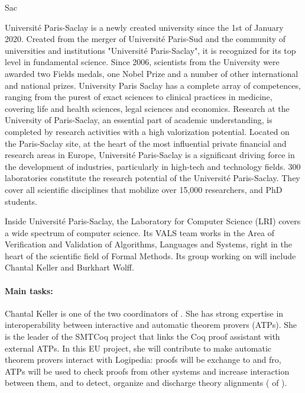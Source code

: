 \begin{sitedescription}{Sac}


Université Paris-Saclay is a newly created university since the 1st of
January 2020. Created from the merger of Université Paris-Sud and the
community of universities and institutions "Université Paris-Saclay", it
is recognized for its top level in fundamental science.  Since 2006,
scientists from the University were awarded two Fields medals, one Nobel
Prize and a number of other international and national prizes.
University Paris Saclay has a complete array of competences, ranging
from the purest of exact sciences to clinical practices in medicine,
covering life and health sciences, legal sciences and economics.
Research at the University of Paris-Saclay, an essential part of
academic understanding, is completed by research activities with a high
valorization potential. Located on the Paris-Saclay site, at the heart
of the most influential private financial and research areas in Europe,
Université Paris-Saclay is a significant driving force in the
development of industries, particularly in high-tech and technology
fields. 300 laboratories constitute the research potential of the
Université Paris-Saclay. They cover all scientific disciplines that
mobilize over 15,000 researchers, and PhD students.

Inside Université Paris-Saclay, the Laboratory for Computer Science
(LRI) covers a wide spectrum of computer science. Its VALS team works in
the Area of Verification and Validation of Algorithms, Languages and
Systems, right in the heart of the scientific field of Formal Methods.
Its group working on \pn will include Chantal Keller and Burkhart Wolff.

\paragraph*{Main tasks:}

\begin{compactitem}
\item Chantal Keller is one of the two coordinators of . She has
strong expertise in interoperability between interactive and automatic
theorem provers (ATPs). She is the leader of the SMTCoq project that
links the Coq proof assistant with external ATPs. In this EU project,
she will contribute to make automatic theorem provers interact with
Logipedia: proofs will be exchange to and fro, ATPs will be used to
check proofs from other systems and increase interaction between them,
and to detect, organize and discharge theory alignments
( of ).


\end{compactitem}
\end{sitedescription}
